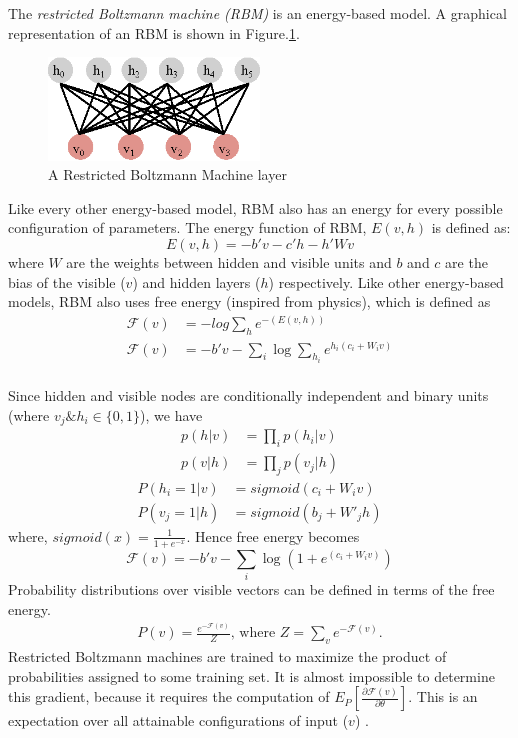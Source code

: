 The \textit{restricted Boltzmann machine (RBM)} is an energy-based model.  A graphical representation of an RBM is shown in Figure.\ref{fig:rbm_layer}.

\begin{figure}[!ht]
  \centering
  \includegraphics[width=0.5\textwidth]{./imgs/rbm.eps}
  \caption{A Restricted Boltzmann Machine layer}
  \label{fig:rbm_layer}
\end{figure}%

Like every other energy-based model, RBM also has an energy for every possible configuration of parameters.  The energy function of RBM, $E(v,h)$ is defined as: 
$$E(v,h) = - b'v - c'h - h'Wv$$
where $W$ are the weights between hidden and visible units and $b$ and $c$ are the bias of the visible ($v$) and hidden layers ($h$) respectively.  Like other energy-based models, RBM also uses free energy (inspired from physics), which is defined as
\begin{align*}
\mathcal{F}(v) &= -log \sum_{h}{e^{-(E(v,h))}} \\
\mathcal{F}(v) &= - b'v - \sum_i \log \sum_{h_i} e^{h_i (c_i + W_i v)}\\
\end{align*}

Since hidden and visible nodes are conditionally independent and binary units (where $v_j \& h_i \in \{0,1\}$), we have 
\begin{align}
p(h|v) &= \prod_i p(h_i|v) \\
p(v|h) &= \prod_j p(v_j|h) 
\end{align}
\begin{align}
P(h_i=1|v) &= sigmoid(c_i + W_i v) \label{eq:rbm_layers_prob1} \\
P(v_j=1|h) &= sigmoid(b_j + W'_j h) \label{eq:rbm_layers_prob2}
\end{align}
where, $sigmoid(x)= \frac{1}{1 + e^{-x}}$. Hence free energy becomes
$$\mathcal{F}(v)= - b'v - \sum_i \log(1 + e^{(c_i + W_i v)})$$ %
Probability distributions over visible vectors can be defined in terms of the free energy.
\begin{align*}
P(v) = \frac{e^{-\mathcal{F}(v)}}{Z} \text{, where } Z=\sum_v e^{-\mathcal{F}(v)}.
\end{align*}
Restricted Boltzmann machines are trained to maximize the product of probabilities assigned to some training set.  It is almost impossible to determine this gradient, because it requires the computation of $E_P[\frac{\partial \mathcal{F}(v)} {\partial \theta} ]$.  This is an expectation over all attainable configurations of input ($v$) \cite{hinton2010practical}.

